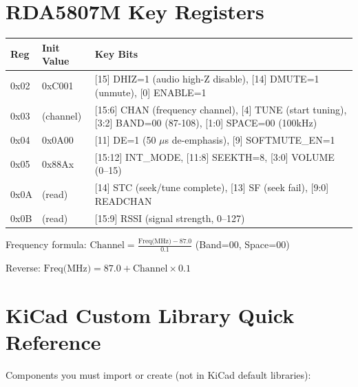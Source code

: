 \documentclass[a4paper,11pt]{article}
\renewcommand*{\,}{ }%
\begin{document}
\section{RDA5807M Key Registers}

\begin{longtable}{@{}p{1.5cm}p{3cm}p{8cm}@{}}
\toprule
\textbf{Reg} & \textbf{Init Value} & \textbf{Key Bits} \\
\midrule
\endhead
0x02 & 0xC001 & [15] DHIZ=1 (audio high-Z disable), [14] DMUTE=1 (unmute), [0] ENABLE=1 \\
0x03 & (channel) & [15:6] CHAN (frequency channel), [4] TUNE (start tuning), [3:2] BAND=00 (87-108), [1:0] SPACE=00 (100kHz) \\
0x04 & 0x0A00 & [11] DE=1 (50\,$\mu$s de-emphasis), [9] SOFTMUTE\_EN=1 \\
0x05 & 0x88Ax & [15:12] INT\_MODE, [11:8] SEEKTH=8, [3:0] VOLUME (0--15) \\
0x0A & (read) & [14] STC (seek/tune complete), [13] SF (seek fail), [9:0] READCHAN \\
0x0B & (read) & [15:9] RSSI (signal strength, 0--127) \\
\bottomrule
\end{longtable}

Frequency formula: $\text{Channel} = \frac{\text{Freq(MHz)} - 87.0}{0.1}$ \quad (Band=00, Space=00)

Reverse: $\text{Freq(MHz)} = 87.0 + \text{Channel} \times 0.1$

\section{KiCad Custom Library Quick Reference}

Components you must import or create (not in KiCad default libraries):
\end{document}
